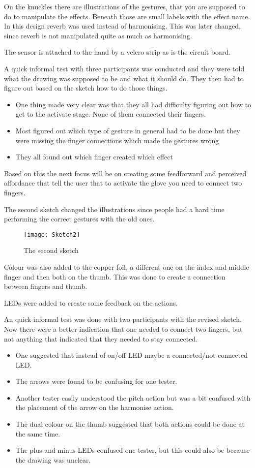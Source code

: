 On the knuckles there are illustrations of the gestures, that you are supposed to do to manipulate the effects. Beneath those are small labels with the effect name. In this design reverb was used instead of harmonising. This was later changed, since reverb is not manipulated quite as much as harmonising. 

The sensor is attached to the hand by a velcro strip as is the circuit board. 

A quick informal test with three participants was conducted and they were told what the drawing was supposed to be and what it should do. They then had to figure out based on the sketch how to do those things. 
\begin{itemize}
	\item One thing made very clear was that they all had difficulty figuring out how to get to the activate stage. None of them connected their fingers.
	\item Most figured out which type of gesture in general had to be done but they were missing the finger connections which made the gestures wrong
	\item They all found out which finger created which effect
\end{itemize}

Based on this the next focus will be on creating some feedforward and perceived affordance that tell the user that to activate the glove you need to connect two fingers.

The second sketch changed the illustrations since people had a hard time performing the correct gestures with the old ones.

\begin{figure}[!h]
\centering
\texttt{[image: Sketch2]}
\caption{The second sketch} \label{Sketch2}
\end{figure}

Colour was also added to the copper foil, a different one on the index and middle finger and then both on the thumb. This was done to create a connection between fingers and thumb.

LEDs were added to create some feedback on the actions.

An quick informal test was done with two participants with the revised sketch. Now there were a better indication that one needed to connect two fingers, but not anything that indicated that they needed to stay connected.
\begin{itemize}
	\item One suggested that instead of on/off LED maybe a connected/not connected LED.
	\item The arrows were found to be confusing for one tester.
	\item Another tester easily understood the pitch action but was a bit confused with the placement of the arrow on the harmonise action.
	\item The dual colour on the thumb suggested that both actions could be done at the same time.
	\item The plus and minus LEDs confused one tester, but this could also be because the drawing was unclear.
\end{itemize}

